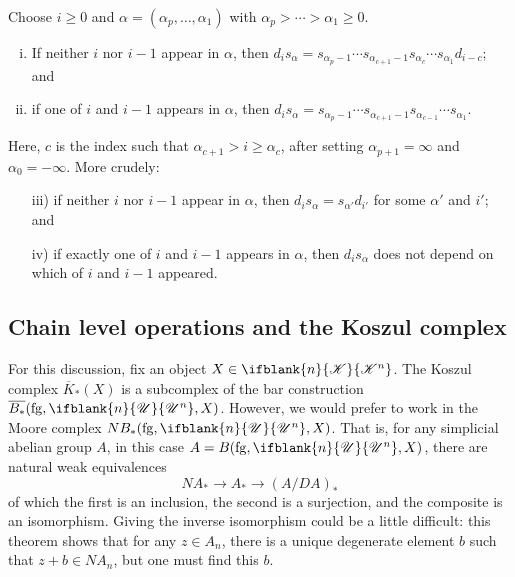 \documentclass[10pt]{article}
\newcommand{\LL}[1]{\ifblank{#1}{\scrK}{\scrK^{#1}}}
\newcommand{\nontop}[1]{\ifblank{#1}{\scrU}{\scrU^{#1}}}
\newcommand{\forget}{\mathrm{fg}}
\begin{document}
\begin{LieLambdaStructureOnKoszul}
\begin{lem}
Choose $i\geq0$ and $\alpha=(\alpha_p,\ldots,\alpha_1)$ with $\alpha_p>\cdots >\alpha_1\geq0$.
\begin{enumerate}[i)]\squishlist
\setlength{\parindent}{.25in}
\item If neither $i$ nor $i-1$ appear in $\alpha$, then  $d_is_\alpha=s_{\alpha_p-1}\cdots s_{\alpha_{c+1}-1}s_{\alpha_c}\cdots s_{\alpha_1}d_{i-c}$; and
\item if one of $i$ and $i-1$ appears in $\alpha$, then  $d_is_\alpha=s_{\alpha_p-1}\cdots s_{\alpha_{c+1}-1}s_{\alpha_{c-1}}\cdots s_{\alpha_1}$.
\end{enumerate}
Here, $c$ is the index such that $\alpha_{c+1}>i\geq\alpha_{c}$, after setting  $\alpha_{p+1}=\infty$ and $\alpha_0=-\infty$. More crudely:
\begin{enumerate}[i)]\squishlist
\setlength{\parindent}{.25in}
\item[iii)] if neither $i$ nor $i-1$ appear in $\alpha$, then  $d_is_\alpha=s_{\alpha'}d_{i'}$ for some $\alpha'$ and $i'$; and
\item[iv)] if exactly one of $i$ and $i-1$ appears in $\alpha$, then  $d_is_\alpha$ does not depend on which of $i$ and $i-1$ appeared.
\end{enumerate}
\end{lem}
\subsection{Chain level operations and the Koszul complex}

For this discussion, fix an object $X\in\LL{n}$.
The Koszul complex $\overline{K}_*(X)$ is a subcomplex of the bar construction $\overline{B_*}(\forget,\nontop{n},X)$. However, we would prefer to work in the Moore complex $N{B_*}(\forget,\nontop{n},X)$. That is, for any simplicial abelian group $A$, in this case $A=B(\forget,\nontop{n},X)$, there are natural weak equivalences
\[NA_*\to A_*\to (A/DA)_*\]
of which the first is an inclusion, the second is a surjection, and the composite is an isomorphism. Giving the inverse isomorphism could be a little difficult: this theorem shows that for any $z\in A_n$, there is a unique degenerate element $b$ such that $z+b\in NA_n$, but one must find this $b$.


\end{LieLambdaStructureOnKoszul}
\end{document}
